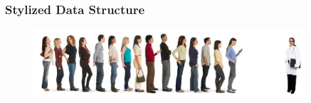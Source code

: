 \documentclass[11pt,table]{beamer}
\begin{document}
\begin{frame}\frametitle{Stylized Data Structure}
\renewcommand{\baselinestretch}{1}
\begin{figure}[h]
\begin{center}
{\includegraphics[width=0.9\textwidth]{figures/queue.png}}
\end{center}
\end{figure}


\begin{table}[htbp]


\end{table}
\end{frame}
\end{document}
